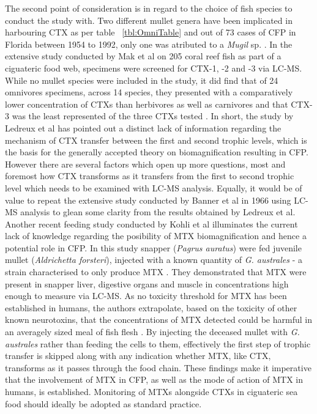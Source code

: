 \documentclass[12pt]{article}
\begin{document}
The second point of consideration is in regard to the choice of fish species to conduct the study with. Two different mullet genera have been implicated in harbouring CTX as per table ~\ref{tbl:OmniTable} and out of 73 cases of CFP in Florida between 1954 to 1992, only one was atributed to a \emph{Mugil} sp. \cite{de1994distribution}. In the extensive study conducted by Mak et al on 205 coral reef fish as part of a ciguateric food web, specimens were screened for CTX-1, -2 and -3 via LC-MS. While no mullet species were included in the study, it did find that of 24 omnivores specimens, across 14 species, they presented with a comparatively lower concentration of CTXs than herbivores as well as carnivores and that CTX-3 was the least represented of the three CTXs tested \cite{mak2013pacific}. 
In short, the study by Ledreux et al has pointed out a distinct lack of information regarding the mechanism of CTX transfer between the first and second trophic levels, which is the basis for the generally accepted theory on biomagnification resulting in CFP. However there are several factors which open up more questions, most and foremost how CTX transforms as it transfers from the first to second trophic level which needs to be examined with LC-MS analysis. Equally, it would be of value to repeat the extensive study conducted by Banner et al in 1966 using LC-MS analysis to glean some clarity from the results obtained by Ledreux et al.\\


Another recent feeding study conducted by Kohli et al illuminates the current lack of knowledge regarding the posibility of MTX biomagnification and hence a potential role in CFP. In this study snapper (\emph{Pagrus auratus}) were fed juvenile mullet (\emph{Aldrichetta forsteri}), injected with a known quantity of \emph{G. australes} - a strain characterised to only produce MTX \cite{kohli2014feeding}. They demonstrated that MTX were present in snapper liver, digestive organs and muscle in concentrations high enough to measure via LC-MS. As no toxicity threshold for MTX has been established in humans, the authors extrapolate, based on the toxicity of other known neurotoxins, that the concentrations of MTX detected could be harmful in an averagely sized meal of fish flesh \cite{kohli2014feeding}.
By injecting the deceased mullet with \emph{G. australes} rather than feeding the cells to them, effectively the first step of trophic transfer is skipped along with any indication whether MTX, like CTX, transforms as it passes through the food chain.
These findings make it imperative that the involvement of MTX in CFP, as well as the mode of action of MTX in humans, is established. Monitoring of MTXs alongside CTXs in ciguateric sea food should ideally be adopted as standard practice.
\end{document}
